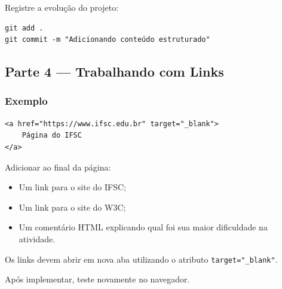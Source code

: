 \documentclass[12pt,a4paper]{article}
\begin{document}
\vspace{0.5cm}

\begin{boxAtividade}

Registre a evolução do projeto:

\begin{boxCodigo}
\begin{verbatim}
git add .
git commit -m "Adicionando conteúdo estruturado"
\end{verbatim}
\end{boxCodigo}

\end{boxAtividade}

\newpage

\subsection{Parte 4 — Trabalhando com Links}

\subsubsection{Exemplo}

\begin{boxCodigo}
\begin{verbatim}
<a href="https://www.ifsc.edu.br" target="_blank">
    Página do IFSC
</a>
\end{verbatim}
\end{boxCodigo}




\begin{boxAtividade}

Adicionar ao final da página:

\begin{itemize}
\item Um link para o site do IFSC;
\item Um link para o site do W3C;
\item Um comentário HTML explicando qual foi sua maior dificuldade na atividade.
\end{itemize}

Os links devem abrir em nova aba utilizando o atributo \texttt{target="\_blank"}.

Após implementar, teste novamente no navegador.

\end{boxAtividade}
\end{document}
